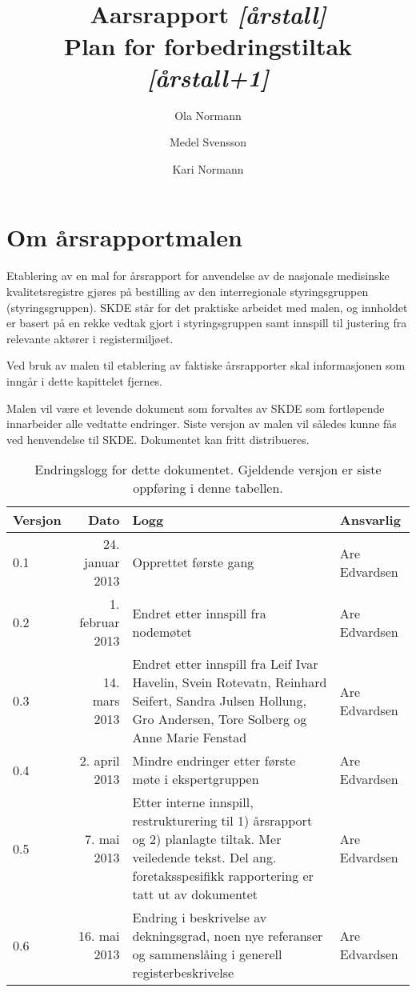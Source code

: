 \documentclass[norsk, a4paper, twocolumn]{report}
\title{\registernavn \\ \textbf{Aarsrapport \textit{[årstall]}\\
Plan for forbedringstiltak \textit{[årstall+1]}}}
\author[1]{Ola Normann}
\author[2]{Medel Svensson}
\author[1]{Kari Normann}
\affil[1]{et Sykehus, et Foretak, et Sted}
\affil[2]{en annen adresse, et annet Sted}
\begin{document}
\maketitle


\onecolumn



\chapter*{Om årsrapportmalen}
Etablering av en mal for årsrapport for anvendelse av de nasjonale medisinske
kvalitetsregistre gjøres på bestilling av den interregionale styringsgruppen
(styringsgruppen).
SKDE står for det praktiske arbeidet med malen, og innholdet er basert på
en rekke vedtak gjort i styringsgruppen samt innspill til justering fra
relevante aktører i registermiljøet.

Ved bruk av malen til etablering av faktiske årsrapporter skal informasjonen
som inngår i dette kapittelet fjernes.

Malen vil være et levende dokument som
forvaltes av SKDE som fortløpende innarbeider alle vedtatte endringer. Siste
versjon av malen vil således kunne fås ved henvendelse til SKDE. Dokumentet
kan fritt distribueres.

\begin{table}[ht]
  \centering
  \begin{tabular}{lrp{8cm}l}
    \hline
    Versjon & Dato & Logg & Ansvarlig \\
    \hline
    0.1 & 24. januar 2013 & Opprettet første gang & Are Edvardsen \\
    0.2 & 1. februar 2013 & Endret etter innspill fra nodemøtet &
    Are Edvardsen \\
    0.3 & 14. mars 2013 & Endret etter innspill fra Leif Ivar Havelin,
    Svein Rotevatn,
    Reinhard Seifert, Sandra Julsen Hollung, Gro Andersen, Tore Solberg og
    Anne Marie Fenstad & Are Edvardsen \\
    0.4 & 2. april 2013 & Mindre endringer etter første møte i ekspertgruppen &
    Are Edvardsen \\
    0.5 & 7. mai 2013 & Etter interne innspill, restrukturering til 1)
    årsrapport og 2) planlagte tiltak. Mer veiledende tekst. Del ang.
    foretaksspesifikk rapportering er tatt ut av dokumentet & Are Edvardsen \\
    0.6 & 16. mai 2013 & Endring i beskrivelse av
    dekningsgrad, noen nye referanser og sammenslåing i generell
    registerbeskrivelse & Are Edvardsen \\
    \hline
  \end{tabular}
  \caption{Endringslogg for dette dokumentet. Gjeldende versjon er siste
  oppføring i denne tabellen.}
  \label{tab:log}
\end{table}
\end{document}
